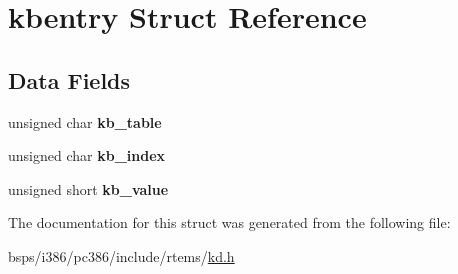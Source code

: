 \hypertarget{structkbentry}{}\section{kbentry Struct Reference}
\label{structkbentry}
\subsection*{Data Fields}
\begin{DoxyCompactItemize}
\item 
\mbox{\label{structkbentry_a290138325ecdf8d5005b245d5800ef96}} 
unsigned char {\bfseries kb\+\_\+table}
\item 
\mbox{\label{structkbentry_aab9989a0efc624ea586604e10d4ccf06}} 
unsigned char {\bfseries kb\+\_\+index}
\item 
\mbox{\label{structkbentry_a8efe2020f0fd64b7f880f17957b5784f}} 
unsigned short {\bfseries kb\+\_\+value}
\end{DoxyCompactItemize}


The documentation for this struct was generated from the following file\+:\begin{DoxyCompactItemize}
\item 
bsps/i386/pc386/include/rtems/\mbox{\hyperlink{kd_8h}{kd.\+h}}\end{DoxyCompactItemize}
